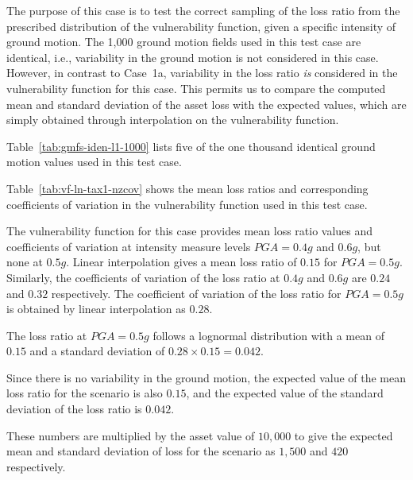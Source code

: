 The purpose of this case is to test the correct sampling of the loss ratio from the prescribed distribution of the vulnerability function, given a specific intensity of ground motion. The 1,000 ground motion fields used in this test case are identical, i.e., variability in the ground motion is not considered in this case. However, in contrast to Case~1a, variability in the loss ratio \emph{is} considered in the vulnerability function for this case. This permits us to compare the computed mean and standard deviation of the asset loss with the expected values, which are simply obtained through interpolation on the vulnerability function.



Table~\ref{tab:gmfs-iden-l1-1000} lists five of the one thousand identical ground motion values used in this test case.



Table~\ref{tab:vf-ln-tax1-nzcov} shows the mean loss ratios and corresponding coefficients of variation in the vulnerability function used in this test case.

The vulnerability function for this case provides mean loss ratio values and coefficients of variation at intensity measure levels $PGA = 0.4 g$ and $0.6 g$, but none at $0.5 g$. Linear interpolation gives a mean loss ratio of $0.15$ for $PGA = 0.5 g$. Similarly, the coefficients of variation of the loss ratio at $0.4 g$ and $0.6 g$ are $0.24$ and $0.32$ respectively. The coefficient of variation of the loss ratio for $PGA = 0.5 g$ is obtained by linear interpolation as $0.28$.

The loss ratio at $PGA = 0.5 g$ follows a lognormal distribution with a mean of $0.15$ and a standard deviation of $0.28 \times 0.15 = 0.042$.

Since there is no variability in the ground motion, the expected value of the mean loss ratio for the scenario is also $0.15$, and the expected value of the standard deviation of the loss ratio is $0.042$.

These numbers are multiplied by the asset value of $10,000$ to give the expected mean and standard deviation of loss for the scenario as $1,500$ and $420$ respectively.
